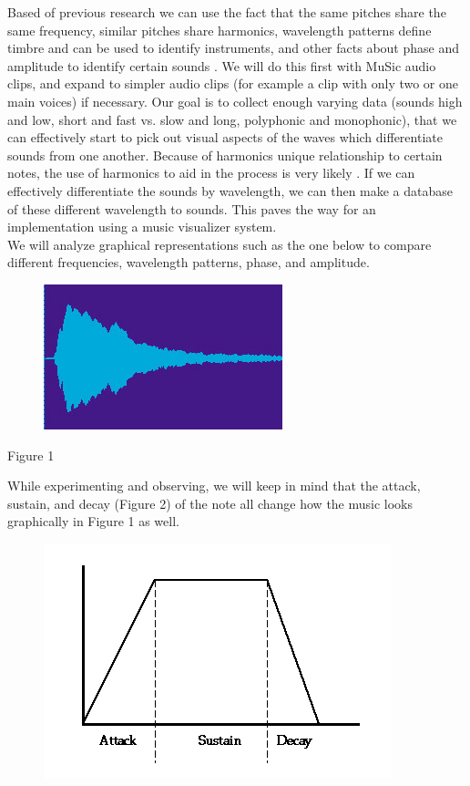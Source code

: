 \documentclass[11pt]{article}
\begin{document}
Based of previous research we can use the fact that the same pitches share the same frequency, similar pitches share harmonics, wavelength patterns define timbre and can be used to identify instruments, and other facts about phase and amplitude to identify certain sounds \cite{} \cite{}. We will do this first with MuSic audio clips, and expand to simpler audio clips (for example a clip with only two or one main voices) if necessary. Our goal is to collect enough varying data (sounds high and low, short and fast vs. slow and long, polyphonic and monophonic), that we can effectively start to pick out visual aspects of the waves which differentiate sounds from one another. Because of harmonics unique relationship to certain notes, the use of harmonics to aid in the process is very likely \cite{}. If we can effectively differentiate the sounds by wavelength, we can then make a database of these different wavelength to sounds. This paves the way for an implementation using a music visualizer system.\\
We will analyze graphical representations such as the one below to compare different frequencies, wavelength patterns, phase, and amplitude.\\
\begin{figure}
\includegraphics[scale=.2]{Music4}
\end{figure}
\begin{center}
Figure 1
\end{center}
While experimenting and observing, we will keep in mind that the attack, sustain, and decay (Figure 2) of the note all change how the music looks graphically in Figure 1 as well.
\begin{figure}
\includegraphics[scale=.2]{Music3}
\end{figure}
\end{document}

